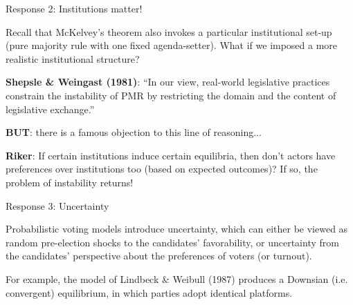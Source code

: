 \documentclass[11pt,aspectratio=169]{beamer}
\begin{document}
\begin{frame}{Response 2: Institutions matter!}

Recall that McKelvey's theorem also invokes a particular institutional set-up (pure majority rule with one fixed agenda-setter). What if we imposed a more realistic institutional structure?

\pause 
\textbf{Shepsle \& Weingast (1981)}: ``In our view, real-world legislative practices constrain the instability of PMR by restricting the domain and the content of legislative exchange.''

\pause
\textbf{BUT}: there is a famous objection to this line of reasoning...

\pause 
\textbf{Riker}: If certain institutions induce certain equilibria, then don't actors have preferences over institutions too (based on expected outcomes)? If so, the problem of instability returns!

\end{frame}

\begin{frame}{Response 3: Uncertainty}

Probabilistic voting models introduce \alert{uncertainty}, which can either be viewed as random pre-election shocks to the candidates' favorability, or uncertainty from the candidates' perspective about the preferences of voters (or turnout). 

\vspace{2em}

For example, the model of \alert{Lindbeck \& Weibull (1987)} produces a Downsian (i.e. convergent) equilibrium, in which parties adopt identical platforms.


\end{frame}
\end{document}
